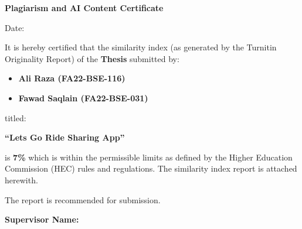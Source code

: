 
\newpage
\thispagestyle{empty}

\begin{center}
\textbf{\LARGE Plagiarism and AI Content Certificate}
\end{center}

\vspace{1cm}

\noindent
Date: \underline{\hspace{4cm}}

\vspace{1cm}

\noindent
It is hereby certified that the similarity index (as generated by the Turnitin 
Originality Report) of the \textbf{Thesis} 
submitted by:

\begin{itemize}
    \item \textbf{Ali Raza (FA22-BSE-116)}
    \item \textbf{Fawad Saqlain (FA22-BSE-031)}  %
\end{itemize}

\noindent
titled:

\begin{center}
\textbf{“Lets Go Ride Sharing App”}
\end{center}

\noindent
is \textbf{7\%} which is within the permissible limits as defined by the 
Higher Education Commission (HEC) rules and regulations. The similarity index 
report is attached herewith.

\vspace{0.5cm}


\vspace{0.5cm}

\noindent
The report is recommended for submission.

\vspace{2cm}

\noindent
\textbf{Supervisor Name:} \underline{\hspace{6cm}}  

